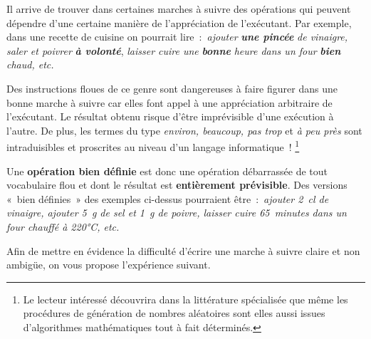 		Il arrive de trouver dans certaines marches à suivre des opérations qui
		peuvent dépendre d’une certaine manière de l’appréciation de
		l’exécutant. Par exemple, dans une recette de cuisine on pourrait 
		lire~:~\textit{ajouter} \textbf{\textit{une pincée}} \textit{de vinaigre,
		saler et poivrer} \textbf{\textit{à volonté}}, \textit{laisser cuire
		une} \textbf{\textit{bonne}}\textit{ heure dans un four
		}\textbf{\textit{bien}} \textit{chaud, etc.}
		
		Des instructions floues de ce genre sont dangereuses à faire figurer
		dans une bonne marche à suivre car elles font appel à une appréciation
		arbitraire de l’exécutant. Le résultat obtenu risque
		d’être imprévisible d’une exécution à l’autre. De plus, les termes du
		type \textit{environ, beaucoup, pas trop} et \textit{à peu près} sont
		intraduisibles et proscrites au niveau d’un langage informatique~!
		\footnote{Le lecteur intéressé découvrira dans la littérature
		spécialisée que même les procédures de génération de nombres aléatoires
		sont elles aussi issues d’algorithmes mathématiques tout à fait
		déterminés.}
		
		Une \textbf{opération bien définie} est donc une opération débarrassée
		de tout vocabulaire flou et dont le résultat est \textbf{entièrement
		prévisible}. Des versions «~bien définies~» des exemples ci-dessus
		pourraient être~:~\textit{ajouter 2~cl de vinaigre, ajouter 5~g de sel
		et 1~g de poivre, laisser cuire 65~minutes dans un four chauffé à
		220°C, etc.}

		Afin de mettre en évidence la difficulté d’écrire une
		marche à suivre claire et non ambigüe, on vous propose
		l’expérience suivant.

